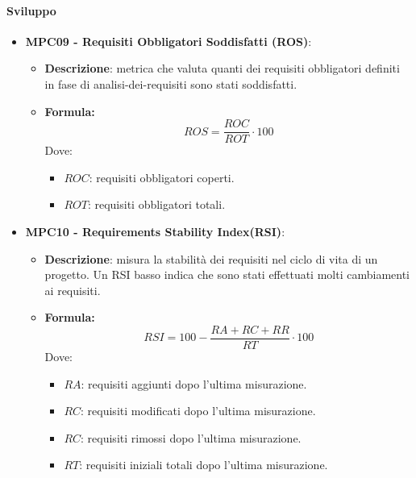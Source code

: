 \documentclass[10pt]{article}
\begin{document}
\begin{justify}
\paragraph{Sviluppo}
\begin{itemize}
\item   \textbf{MPC09 - Requisiti Obbligatori Soddisfatti (ROS)}:
            \begin{itemize}
                \item   \textbf{Descrizione}: metrica che valuta quanti dei requisiti obbligatori definiti in fase di analisi-dei-requisiti sono stati soddisfatti.
                \item   \textbf{Formula:}
                        \[
                        ROS = \frac{ROC}{ROT} \cdot 100
                        \]
                        Dove:
                        \begin{itemize}
                            \item $ROC$: requisiti obbligatori coperti.
                            \item $ROT$: requisiti obbligatori totali.
                        \end{itemize}
            \end{itemize}
\item \textbf{MPC10 - Requirements Stability Index(RSI)}:
            \begin{itemize}
                \item   \textbf{Descrizione}: misura la stabilità dei requisiti nel ciclo di vita di un progetto. Un RSI basso indica che sono stati effettuati molti cambiamenti ai requisiti.
                \item   \textbf{Formula:}
                        \[
                        RSI = 100 - \frac{RA+RC+RR}{RT} \cdot 100
                        \]
                        Dove:
                        \begin{itemize}
                            \item $RA$: requisiti aggiunti dopo l'ultima misurazione.
                            \item $RC$: requisiti modificati dopo l'ultima misurazione.
                            \item $RC$: requisiti rimossi dopo l'ultima misurazione.
                            \item $RT$: requisiti iniziali totali dopo l'ultima misurazione.
                        \end{itemize}
            \end{itemize}
            

\end{itemize}
\end{justify}
\end{document}
